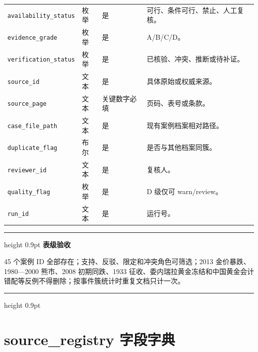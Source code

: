 \documentclass[UTF8,fontset=windows,12pt,openany]{ctexbook}
\newenvironment{gatebox}[1][]{%
  \par\medskip\noindent\begin{center}\begin{minipage}{0.93\textwidth}%
  \color{GoldLine}\hrule height 0.9pt\vspace{0.45em}%
  \textbf{#1}\par\smallskip\color{black}%
}{%
  \par\vspace{0.35em}\color{GoldLine}\hrule height 0.9pt%
  \end{minipage}\end{center}\medskip%
}
\newcommand{\Field}[1]{{\small\nolinkurl{#1}}}
\begin{document}
\begin{longtable}{p{3.7cm}p{2.4cm}p{2.1cm}p{5.0cm}}
\Field{availability_status} & 枚举 & 是 & 可行、条件可行、禁止、人工复核。\\
\Field{evidence_grade} & 枚举 & 是 & A/B/C/D。\\
\Field{verification_status} & 枚举 & 是 & 已核验、冲突、推断或待补证。\\
\Field{source_id} & 文本 & 是 & 具体原始或权威来源。\\
\Field{source_page} & 文本 & 关键数字必填 & 页码、表号或条款。\\
\Field{case_file_path} & 文本 & 是 & 现有案例档案相对路径。\\
\Field{duplicate_flag} & 布尔 & 是 & 是否与其他档案同簇。\\
\Field{reviewer_id} & 文本 & 是 & 复核人。\\
\Field{quality_flag} & 枚举 & 是 & D 级仅可 warn/review。\\
\Field{run_id} & 文本 & 是 & 运行号。\\
\bottomrule
\end{longtable}

\begin{gatebox}[表级验收]
45 个案例 ID 全部存在；支持、反驳、限定和冲突角色可筛选；2013 金价暴跌、1980—2000 熊市、2008 初期同跌、1933 征收、委内瑞拉黄金冻结和中国黄金会计错配等反例不得删除；按事件簇统计时重复文档只计一次。
\end{gatebox}

\chapter{source\_registry 字段字典}
\end{document}
